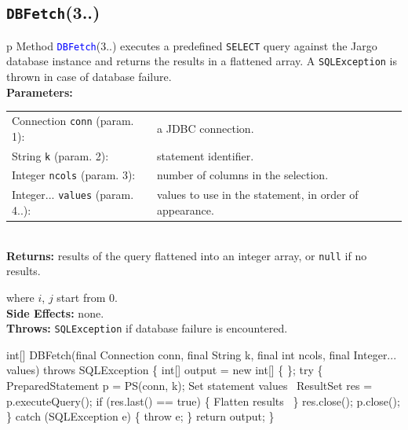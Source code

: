 \subsection{\texttt{DBFetch}(3..)}
\begin{tabular}{p{\textwidth}}
\toprule
{}
Method \textcolor{blue}{{\tt{}\protect{}DBFetch}}(3..) executes a predefined {\tt{}SELECT}
query against the Jargo database instance and returns the results in a
flattened array. A {\tt{}SQLException} is thrown in case of database failure.\\
\midrule
\textbf{Parameters:} \\
\begin{tabular}{lp{116mm}}
Connection {\tt{}conn} (param. 1):&a JDBC connection.\\
String {\tt{}k} (param. 2):&statement identifier.\\
Integer {\tt{}ncols} (param. 3):&number of columns in the selection.\\
Integer... {\tt{}values} (param. 4..):&values to use in the statement, in order
of appearance.
\end{tabular}\\
\textbf{Returns:} results of the query flattened into an integer array,
or {\tt{}null} if no results.


where $i$, $j$ start from 0.\\
\textbf{Side Effects:} none.\\
\textbf{Throws:} {\tt{}SQLException} if database failure is encountered.\\
\bottomrule
\end{tabular}
\nwenddocs{}\endmoddef{}
int[] DBFetch(final Connection conn, final String k, final int ncols, final Integer... values)
throws SQLException \{
  int[] output = new int[] \{ \};
  try \{
    PreparedStatement p = PS(conn, k);
    \LA{}Set statement values~{\nwtagstyle{}}\RA{}
    ResultSet res = p.executeQuery();
    if (res.last() == true) \{
      \LA{}Flatten results~{\nwtagstyle{}}\RA{}
    \}
    res.close();
    p.close();
  \} catch (SQLException e) \{
    throw e;
  \}
  return output;
\}
\eatline
{}\nwendcode{}\nwdocspar
